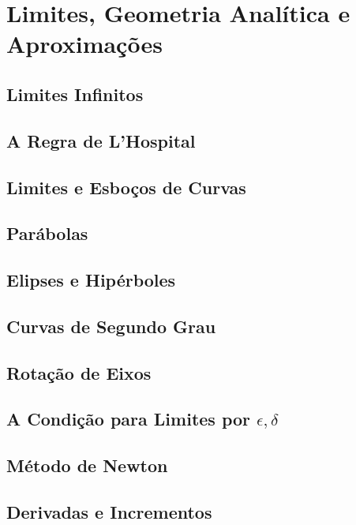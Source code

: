 \documentclass{svmono}
\begin{document}
\chapter{Limites, Geometria Analítica e Aproximações}
\label{chp:limits}

\section{Limites Infinitos}
\label{sec:inflimits}

\section{A Regra de L'Hospital}
\label{sec:lhospital}

\section{Limites e Esboços de Curvas}
\label{sec:limsketch}

\section{Parábolas}
\label{sec:parabolas}

\section{Elipses e Hipérboles}
\label{sec:ellipses}

\section{Curvas de Segundo Grau}
\label{sec:seconddegcurves}

\section{Rotação de Eixos}
\label{sec:rotationaxes}

\section{A Condição para Limites por $\epsilon, \delta$}
\label{sec:epsilondelta}

\section{Método de Newton}
\label{sec:newtonmethod}

\section{Derivadas e Incrementos}
\label{sec:derivsinc}
\end{document}
